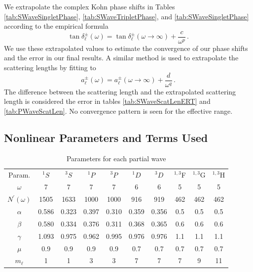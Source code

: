 \documentclass[preprint,showpacs,showkeys,preprintnumbers,amsmath,amssymb,longbibliography,pra,aps]{revtex4-1}
\begin{document}
We extrapolate the complex Kohn phase shifts in Tables
\ref{tab:SWaveSingletPhase}, \ref{tab:SWaveTripletPhase}, and
\ref{tab:SWaveSingletPhase} according to the empirical formula
\cite{VanReeth2003}
\begin{equation}
\label{eq:Extrap}
\tan\delta_\ell^\pm(\omega) = \tan\delta_\ell^\pm(\omega\to\infty) +
  \frac{c}{\omega^p}\, .
\end{equation}
We use these extrapolated values to estimate the convergence of our phase 
shifts and the error in our final results. A similar method is used to
extrapolate the scattering lengths by fitting to
\begin{equation}
\label{eq:ExtrapA}
a_\ell^\pm(\omega) = a_\ell^\pm(\omega\to\infty) + \frac{d}{\omega^q}\, .
\end{equation}
The difference between the scattering length and the extrapolated scattering 
length is considered the error in tables \ref{tab:SWaveScatLenERT} and
\ref{tab:PWaveScatLen}. No convergence pattern is seen for the effective range.

\subsection{Nonlinear Parameters and Terms Used}
\label{sec:Parameters}

\begin{table}[H]
  \centering
	\begin{ruledtabular}
    \begin{tabular}{cccccccccc}
    Param. & $^1S$ & $^3S$ & $^1P$ & $^3P$ & $^1D$ & $^3D$ & $^{1,3}$F & $^{1,3}$G & $^{1,3}$H \\
    \colrule
	$\omega$           & 7     & 7     & 7     & 7     & 6     & 6     & 5    & 5   & 5 \\
	$N^\prime(\omega)$ & 1505  & 1633  & 1000  & 1000  & 916   & 919   & 462  & 462 & 462 \\
	$\alpha$           & 0.586 & 0.323 & 0.397 & 0.310 & 0.359 & 0.356 & 0.5  & 0.5 & 0.5 \\
	$\beta$            & 0.580 & 0.334 & 0.376 & 0.311 & 0.368 & 0.365 & 0.6  & 0.6 & 0.6 \\
	$\gamma$           & 1.093 & 0.975 & 0.962 & 0.995 & 0.976 & 0.976 & 1.1  & 1.1 & 1.1 \\
	$\mu$              & 0.9   & 0.9   & 0.9   & 0.9   & 0.7   & 0.7   & 0.7  & 0.7 & 0.7 \\
	$m_\ell$           & 1     & 1     & 3     & 3     & 7     & 7     & 7    & 9   & 11 \\
    \end{tabular}
  \end{ruledtabular}
  \caption{Parameters for each partial wave}
  \label{tab:Nonlinear}
\end{table}
\end{document}
